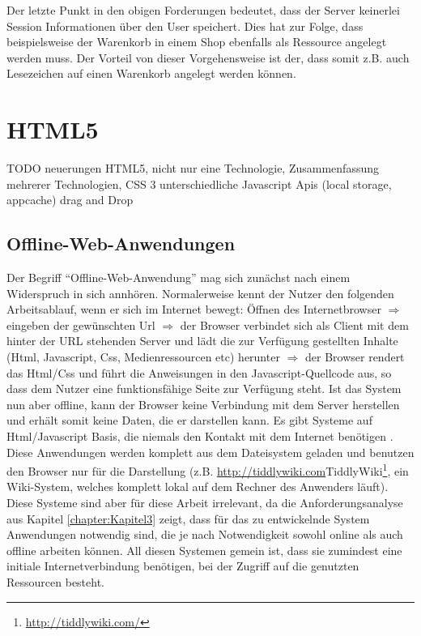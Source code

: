 Der letzte Punkt in den obigen Forderungen bedeutet, dass der Server keinerlei Session Informationen über den User speichert. Dies hat zur Folge, dass beispielsweise der Warenkorb in einem Shop ebenfalls als Ressource angelegt werden muss. Der Vorteil von dieser Vorgehensweise ist der, dass somit z.B. auch Lesezeichen auf einen Warenkorb angelegt werden können.
 
\section{HTML5}\label{section:html5}
TODO neuerungen HTML5, nicht nur eine Technologie, Zusammenfassung mehrerer Technologien, CSS 3 unterschiedliche Javascript Apis (local storage, appcache) drag and Drop

\subsection{Offline-Web-Anwendungen}
Der Begriff "`Offline-Web-Anwendung"' mag sich zunächst nach einem Widerspruch in sich annhören. Normalerweise kennt der Nutzer den folgenden Arbeitsablauf, wenn er sich im Internet bewegt: Öffnen des Internetbrowser $\Rightarrow$ eingeben der gewünschten Url $\Rightarrow$ der Browser verbindet sich als Client mit dem hinter der URL stehenden Server und lädt die zur Verfügung gestellten Inhalte (Html, Javascript, Css, Medienressourcen etc) herunter $\Rightarrow$ der Browser rendert das Html/Css und führt die Anweisungen in den Javascript-Quellcode aus, so dass dem Nutzer eine funktionsfähige Seite zur Verfügung steht. Ist das System nun aber offline, kann der Browser keine Verbindung mit dem Server herstellen und erhält somit keine Daten, die er darstellen kann. Es gibt Systeme auf Html/Javascript Basis, die niemals den Kontakt mit dem Internet benötigen \cite{html5_rocks_offline_what_does_it_mean}. Diese Anwendungen werden komplett aus dem Dateisystem geladen und benutzen den Browser nur für die Darstellung (z.B. \url{http://tiddlywiki.com}{TiddlyWiki}\footnote{\url{http://tiddlywiki.com/}}, ein Wiki-System, welches komplett lokal auf dem Rechner des Anwenders läuft). Diese Systeme sind aber für diese Arbeit irrelevant, da die Anforderungsanalyse aus Kapitel \ref{chapter:Kapitel3} zeigt, dass für das zu entwickelnde System Anwendungen notwendig sind, die je nach Notwendigkeit sowohl online als auch offline arbeiten können. All diesen Systemen gemein ist, dass sie zumindest eine initiale Internetverbindung benötigen, bei der Zugriff auf die genutzten Ressourcen besteht. 


